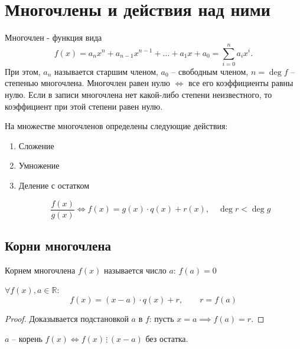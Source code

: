 \documentclass[12pt, a4paper]{article}
\begin{document}
    \section{Многочлены и действия над ними}
    \begin{definition}
        Многочлен - функция вида \[
            f(x) = a_{n}x^{n} + a_{n-1}x^{n-1} + \ldots  + a_{1}x + a_{0} = \sum_{i=0}^{n} a_i x^{i}.
        \]При этом, \( a_{n} \) называется старшим членом, \( a_{0} \) -- свободным членом, \( n = \deg f \) -- степенью многочлена. Многочлен равен нулю \( \iff \) все его коэффициенты равны нулю. Если в записи многочлена нет какой-либо степени неизвестного, то коэффициент при этой степени равен нулю.
    \end{definition}
    На множестве многочленов определены следующие действия: 
    \begin{enumerate}
        \item Сложение
        \item Умножение 
        \item Деление с остатком

            \[
                \frac{f(x)}{g(x)} \iff f(x) = g(x) \cdot q(x) + r(x), \quad \deg r < \deg g
            \] 
    \end{enumerate}
    \subsection{Корни многочлена}
    \begin{definition}
        Корнем многочлена \( f(x) \) называется число \( a \): \( f(a) = 0 \)
    \end{definition}
    \begin{theorem}[Безу]
        \( \forall f(x), a \in \mathbb{R} \): \[
            f(x) = (x-a) \cdot q(x) + r, \qquad r = f(a)
        \] 
    \end{theorem}
    \begin{proof}
        Доказывается подстановкой \( a \) в \( f \): пусть \( x = a \implies f(a) = r \).
    \end{proof}
    \begin{cor}
        \( a \) -- корень \( f(x) \iff f(x) \, \vdots \, (x - a) \) без остатка.
    \end{cor}
\end{document}
